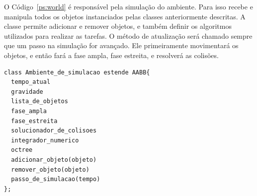 O Código~\ref{ps:world} é responsável pela simulação do ambiente. Para isso recebe e manipula todos os objetos instanciados pelas classes anteriormente descritas. A classe permite adicionar e remover objetos, e também definir os algoritmos utilizados para realizar as tarefas.
O método de atualização será chamado sempre que um passo na simulação for avançado. Ele primeiramente movimentará os objetos, e então fará a fase ampla, fase
estreita, e resolverá as colisões.

\begin{lstlisting}[frame=single,caption=Modelagem prévia para ambiente de simulação\label{ps:world}]
class Ambiente_de_simulacao estende AABB{
  tempo_atual
  gravidade
  lista_de_objetos
  fase_ampla
  fase_estreita
  solucionador_de_colisoes
  integrador_numerico
  octree
  adicionar_objeto(objeto)
  remover_objeto(objeto)
  passo_de_simulacao(tempo)
};
\end{lstlisting}


